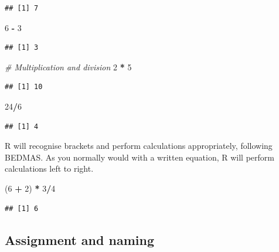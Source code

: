 \documentclass[
]{book}
\newenvironment{Shaded}{\begin{snugshade}}{\end{snugshade}}
\newcommand{\CommentTok}[1]{\textcolor[rgb]{0.56,0.35,0.01}{\textit{#1}}}
\newcommand{\DecValTok}[1]{\textcolor[rgb]{0.00,0.00,0.81}{#1}}
\newcommand{\NormalTok}[1]{#1}
\newcommand{\SpecialCharTok}[1]{\textcolor[rgb]{0.81,0.36,0.00}{\textbf{#1}}}
\begin{document}
\begin{verbatim}
## [1] 7
\end{verbatim}

\begin{Shaded}
\begin{Highlighting}[]
\DecValTok{6} \SpecialCharTok{{-}} \DecValTok{3}
\end{Highlighting}
\end{Shaded}

\begin{verbatim}
## [1] 3
\end{verbatim}

\begin{Shaded}
\begin{Highlighting}[]
\CommentTok{\# Multiplication and division}
\DecValTok{2} \SpecialCharTok{*} \DecValTok{5}
\end{Highlighting}
\end{Shaded}

\begin{verbatim}
## [1] 10
\end{verbatim}

\begin{Shaded}
\begin{Highlighting}[]
\DecValTok{24}\SpecialCharTok{/}\DecValTok{6}
\end{Highlighting}
\end{Shaded}

\begin{verbatim}
## [1] 4
\end{verbatim}

R will recognise brackets and perform calculations appropriately, following BEDMAS. As you normally would with a written equation, R will perform calculations left to right.

\begin{Shaded}
\begin{Highlighting}[]
\NormalTok{(}\DecValTok{6} \SpecialCharTok{+} \DecValTok{2}\NormalTok{) }\SpecialCharTok{*} \DecValTok{3}\SpecialCharTok{/}\DecValTok{4}
\end{Highlighting}
\end{Shaded}

\begin{verbatim}
## [1] 6
\end{verbatim}

\hypertarget{assignment-and-naming}{%
\subsection{Assignment and naming}\label{assignment-and-naming}}
\end{document}
